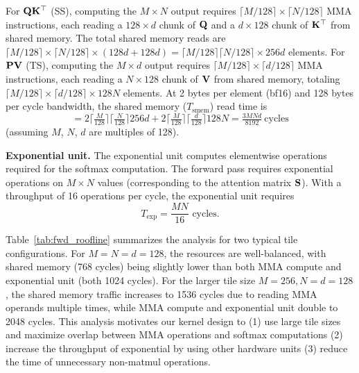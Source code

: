 For $\mathbf{Q}\mathbf{K}^\top$ (SS), computing the $M \times N$ output requires $\lceil M/128 \rceil \times \lceil N/128 \rceil$ MMA instructions, each reading a $128 \times d$ chunk of $\mathbf{Q}$ and a $d \times 128$ chunk of $\mathbf{K}^\top$ from shared memory. The total shared memory reads are $\lceil M/128 \rceil \times \lceil N/128 \rceil \times (128d + 128d) = \lceil M/128 \rceil \lceil N/128 \rceil \times 256d$ elements. For $\mathbf{P}\mathbf{V}$ (TS), computing the $M \times d$ output requires $\lceil M/128 \rceil \times \lceil d/128 \rceil$ MMA instructions, each reading a $N \times 128$ chunk of $\mathbf{V}$ from shared memory, totaling $\lceil M/128 \rceil \times \lceil d/128 \rceil \times 128N$ elements. At 2 bytes per element (bf16) and 128 bytes per cycle bandwidth, the shared memory ($T_{\text{smem}}$) read time is
{\setlength{\abovedisplayskip}{1pt}%
 \setlength{\belowdisplayskip}{0.1pt}%
 \setlength{\abovedisplayshortskip}{1pt}%
 \setlength{\belowdisplayshortskip}{0.1pt}%
\begin{equation}
  = 
  2\Big\lceil\tfrac{M}{128}\Big\rceil\Big\lceil\tfrac{N}{128}\Big\rceil 256d
+ 2\Big\lceil\tfrac{M}{128}\Big\rceil\Big\lceil\tfrac{d}{128}\Big\rceil 128N
= \tfrac{3MNd}{8192}\ \text{cycles}
\end{equation}}
(assuming $M$, $N$, $d$ are multiples of 128).

\noindent\textbf{Exponential unit.}
The exponential unit computes elementwise operations required for the softmax computation. The forward pass requires exponential operations on $M \times N$ values (corresponding to the attention matrix $\mathbf{S}$). With a throughput of 16 operations per cycle, the exponential unit requires
{\setlength{\abovedisplayskip}{0.1pt}%
 \setlength{\belowdisplayskip}{1pt}%
 \setlength{\abovedisplayshortskip}{0.1pt}%
 \setlength{\belowdisplayshortskip}{1pt}%
\begin{equation}
    T_{\text{exp}} = \frac{MN}{16} \text{ cycles}.
\end{equation}}

Table~\ref{tab:fwd_roofline} summarizes the analysis for two typical tile configurations. For $M = N = d = 128$, the resources are well-balanced, with shared memory (768 cycles) being slightly lower than both MMA compute and exponential unit (both 1024 cycles). For the larger tile size $M = 256, N = d = 128$, the shared memory traffic increases to 1536 cycles due to reading MMA operands multiple times, while MMA compute and exponential unit double to 2048 cycles. This analysis motivates our kernel design to (1) use large tile sizes and maximize overlap between MMA operations and softmax computations (2) increase the throughput of exponential by using other hardware units (3) reduce the time of unnecessary non-matmul operations.

